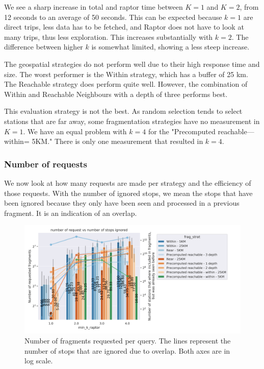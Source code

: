 We see a sharp increase in total and raptor time between $K=1$ and $K=2$, from 12 seconds to an average of 50 seconds. This can be expected because $k=1$ are direct trips, less data has to be fetched, and Raptor does not have to look at many trips, thus less exploration. This increases substantially with $k=2$.
The difference between higher $k$ is somewhat limited, showing a less steep increase.

The geospatial strategies do not perform well due to their high response time and size. The worst performer is the Within strategy, which has a buffer of 25 km. The Reachable strategy does perform quite well. However, the combination of Within and Reachable Neighbours with a depth of three performs best.

This evaluation strategy is not the best. As random selection tends to select stations that are far away, some fragmentation strategies have no measurement in $K=1$. We have an equal problem with $k=4$ for the "Precomputed reachable—within= 5KM." There is only one measurement that resulted in $k=4$.
\subsubsection{Number of requests}
We now look at how many requests are made per strategy and the efficiency of those requests. With the number of ignored stops, we mean the stops that have been ignored because they only have been seen and processed in a previous fragment. It is an indication of an overlap.
\begin{figure}[H]
    \centering
    \includegraphics[width=1.1\textwidth]{images/random_request(6).png}
    \caption{Number of fragments requested per query. The lines represent the number of stops that are ignored due to overlap. Both axes are in log scale. }
    \label{fig:spentfetching}
\end{figure}

